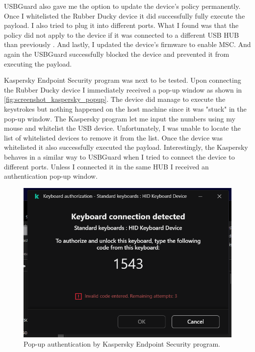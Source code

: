 USBGuard also gave me the option to update the device's policy permanently. Once I whitelisted the Rubber Ducky device it did successfully fully execute the payload. I also tried to plug it into different ports. What I found was that the policy did not apply to the device if it was connected to a different USB HUB than previously . And lastly, I updated the device's firmware to enable MSC. And again the USBGuard successfully blocked the device and prevented it from executing the payload.

Kaspersky Endpoint Security program was next to be tested. Upon connecting the Rubber Ducky device I immediately received a pop-up window as shown in \autoref{fig:screenshot_kaspersky_popup}. The device did manage to execute the keystrokes but nothing happened on the host machine since it was "stuck" in the pop-up window. The Kaspersky program let me input the numbers using my mouse and whitelist the USB device. Unfortunately, I was unable to locate the list of whitelisted devices to remove it from the list. Once the device was whitelisted it also successfully executed the payload. Interestingly, the Kaspersky behaves in a similar way to USBGuard when I tried to connect the device to different ports. Unless I connected it in the same HUB I received an authentication pop-up window.

\begin{figure}[ht]
    \centering
    \includegraphics[width=\linewidth]{./obrazky-figures/kaspersky_keyboard_test.png}
    \caption{Pop-up authentication by Kaspersky Endpoint Security program.}
    \label{fig:screenshot_kaspersky_popup}
\end{figure}

